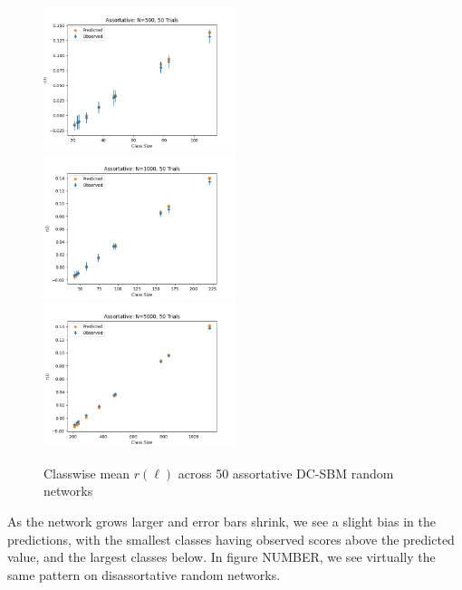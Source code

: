 \documentclass[12pt]{article}
\begin{document}
\begin{figure}[h!]
\includegraphics[width=0.5\textwidth]{assortative_N_500_trials_50.png}
\includegraphics[width=0.5\textwidth]{assortative_N_1000_trials_50.png}
\includegraphics[width=0.5\textwidth]{assortative_N_5000_trials_50.png}
\caption{Classwise mean $r(\ell)$ across 50 assortative DC-SBM random networks}
\end{figure}

As the network grows larger and error bars shrink, we see a slight bias in the predictions, with the smallest classes having observed scores above the predicted value, and the largest classes below.  In figure NUMBER, we see virtually the same pattern on disassortative random networks. 
\end{document}
